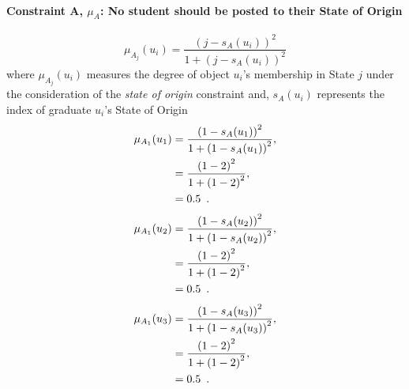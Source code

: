 \documentclass[a4paper,openany]{book}
\begin{document}
			\paragraph{Constraint A, $\mu_A$: No student should be posted to their State of Origin}
				\begin{equation}
					\mu_{A_j}(u_i) = \frac{\left(j-s_A(u_i)\right)^2}{1 + \left(j-s_A(u_i)\right)^2}
				\end{equation}
				where $\mu_{A_j}(u_i)$ measures the degree of object $u_i$'s membership in State $j$ under the consideration of the \textit{state of origin} constraint and,
				$s_A(u_i)$ represents the index of graduate $u_i$'s State of Origin
				\begin{align}
					\mu_{A_1}(u_1) &= \frac{\left(1-s_A(u_1)\right)^2}{1 + \left(1-s_A(u_1)\right)^2} ,\\
					&= \frac{\left(1-2\right)^2}{1 + \left(1-2\right)^2} \notag ,\\
					&= 0.5 \enspace. \notag
				\end{align}
				\begin{align}
					\mu_{A_1}(u_2) &= \frac{\left(1-s_A(u_2)\right)^2}{1 + \left(1-s_A(u_2)\right)^2} ,\\
					&= \frac{\left(1-2\right)^2}{1 + \left(1-2\right)^2} \notag ,\\
					&= 0.5 \enspace. \notag
				\end{align}
				\begin{align}
					\mu_{A_1}(u_3) &= \frac{\left(1-s_A(u_3)\right)^2}{1 + \left(1-s_A(u_3)\right)^2} ,\\
					&= \frac{\left(1-2\right)^2}{1 + \left(1-2\right)^2} \notag ,\\
					&= 0.5 \enspace. \notag
				\end{align}
\end{document}
